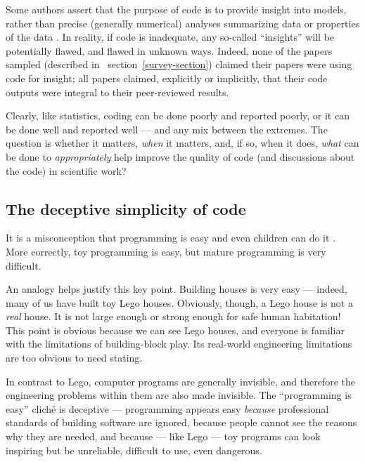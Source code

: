 \documentclass{comjnl}
\begin{document}
Some authors assert that the purpose of code is to provide insight into models, rather than precise (generally numerical) analyses summarizing data or properties of the data \cite{assessing-quality}. In reality, if code is inadequate, any so-called ``insights'' will be potentially flawed, and flawed in unknown ways. Indeed, none of the papers sampled (described in \supplement\ section~\ref{survey-section}) claimed their papers were using code for insight; all papers claimed, explicitly or implicitly, that their code outputs were integral to their peer-reviewed results.

Clearly, like statistics, coding can be done poorly and reported poorly, or it can be done well and reported well --- and any mix between the extremes. The question is whether it matters, \emph{when\/} it matters, and, if so, when it does, \emph{what\/} can be done to \emph{appropriately\/} help improve the quality of code (and discussions about the code) in scientific work?

\subsection{The deceptive simplicity of code}\label{deceptive-simplicity-of-code}
It is a misconception that programming is easy and even children can do it \cite{fixit}. More correctly, toy programming is easy, but mature programming is very difficult. %

An analogy helps justify this key point. Building houses is very easy --- indeed, many of us have built toy Lego houses. Obviously, though, a Lego house is not a \emph{real\/} house. It is not large enough or strong enough for safe human habitation! This point is obvious because we can see Lego houses, and everyone is familiar with the limitations of building-block play. Its real-world engineering limitations are too obvious to need stating. 

In contrast to Lego, computer programs are generally invisible, and therefore the engineering problems within them are also made invisible. The ``programming is easy'' clich\' e is deceptive --- programming appears easy \emph{because\/} professional standards of building software are ignored, because people cannot see the reasons why they are needed, and because --- like Lego --- toy programs can look inspiring but be unreliable, difficult to use, even dangerous. 
\end{document}
